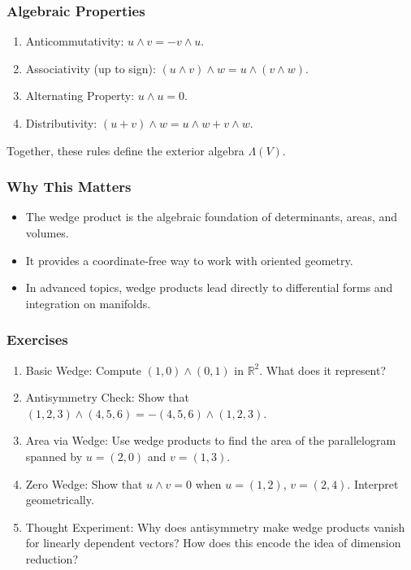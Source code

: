 \documentclass[
  letterpaper,
  DIV=11,
  numbers=noendperiod]{scrreprt}
\providecommand{\tightlist}{%
  \setlength{\itemsep}{0pt}\setlength{\parskip}{0pt}}
\begin{document}
\subsubsection{Algebraic Properties}\label{algebraic-properties}

\begin{enumerate}
\def\labelenumi{\arabic{enumi}.}
\tightlist
\item
  Anticommutativity: \(u \wedge v = -v \wedge u\).
\item
  Associativity (up to sign):
  \((u \wedge v) \wedge w = u \wedge (v \wedge w)\).
\item
  Alternating Property: \(u \wedge u = 0\).
\item
  Distributivity: \((u+v) \wedge w = u \wedge w + v \wedge w\).
\end{enumerate}

Together, these rules define the exterior algebra \(\Lambda(V)\).

\subsubsection{Why This Matters}\label{why-this-matters-16}

\begin{itemize}
\tightlist
\item
  The wedge product is the algebraic foundation of determinants, areas,
  and volumes.
\item
  It provides a coordinate-free way to work with oriented geometry.
\item
  In advanced topics, wedge products lead directly to differential forms
  and integration on manifolds.
\end{itemize}

\subsubsection{Exercises}\label{exercises-28}

\begin{enumerate}
\def\labelenumi{\arabic{enumi}.}
\item
  Basic Wedge: Compute \((1,0) \wedge (0,1)\) in \(\mathbb{R}^2\). What
  does it represent?
\item
  Antisymmetry Check: Show that
  \((1,2,3) \wedge (4,5,6) = - (4,5,6) \wedge (1,2,3)\).
\item
  Area via Wedge: Use wedge products to find the area of the
  parallelogram spanned by \(u=(2,0)\) and \(v=(1,3)\).
\item
  Zero Wedge: Show that \(u \wedge v = 0\) when \(u=(1,2)\),
  \(v=(2,4)\). Interpret geometrically.
\item
  Thought Experiment: Why does antisymmetry make wedge products vanish
  for linearly dependent vectors? How does this encode the idea of
  dimension reduction?
\end{enumerate}
\end{document}
